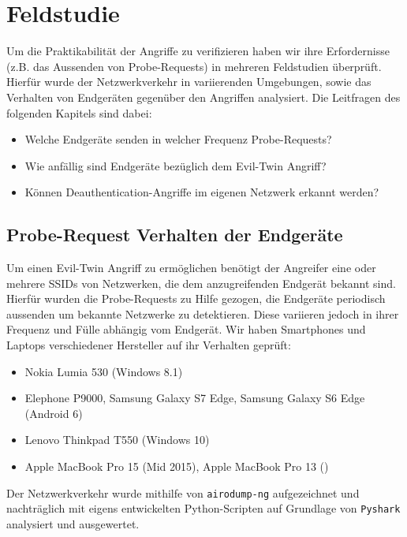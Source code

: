 \section{Feldstudie}
Um die Praktikabilität der Angriffe zu verifizieren haben wir ihre Erfordernisse (z.B. das Aussenden von Probe-Requests) in mehreren Feldstudien überprüft.
Hierfür wurde der Netzwerkverkehr in variierenden Umgebungen, sowie das Verhalten von Endgeräten gegenüber den Angriffen analysiert.
Die Leitfragen des folgenden Kapitels sind dabei:
\begin{itemize}
	\item Welche Endgeräte senden in welcher Frequenz Probe-Requests?
	\item Wie anfällig sind Endgeräte bezüglich dem Evil-Twin Angriff?
	\item Können Deauthentication-Angriffe im eigenen Netzwerk erkannt werden?
\end{itemize}

\subsection{Probe-Request Verhalten der Endgeräte}\label{subs:praxisprobes}
Um einen Evil-Twin Angriff zu ermöglichen benötigt der Angreifer eine oder mehrere SSIDs von Netzwerken, die dem anzugreifenden Endgerät bekannt sind.
Hierfür wurden die Probe-Requests zu Hilfe gezogen, die Endgeräte periodisch aussenden um bekannte Netzwerke zu detektieren.
Diese variieren jedoch in ihrer Frequenz und Fülle abhängig vom Endgerät.
Wir haben Smartphones und Laptops verschiedener Hersteller auf ihr Verhalten geprüft:
\begin{itemize}
	\item Nokia Lumia 530 (Windows 8.1)
	\item Elephone P9000, Samsung Galaxy S7 Edge, Samsung Galaxy S6 Edge (Android 6)
	\item Lenovo Thinkpad T550 (Windows 10)
	\item Apple MacBook Pro 15 (Mid 2015), Apple MacBook Pro 13 () %
\end{itemize}
Der Netzwerkverkehr wurde mithilfe von \texttt{airodump-ng} aufgezeichnet und nachträglich mit eigens entwickelten Python-Scripten auf Grundlage von \texttt{Pyshark} analysiert und ausgewertet.


